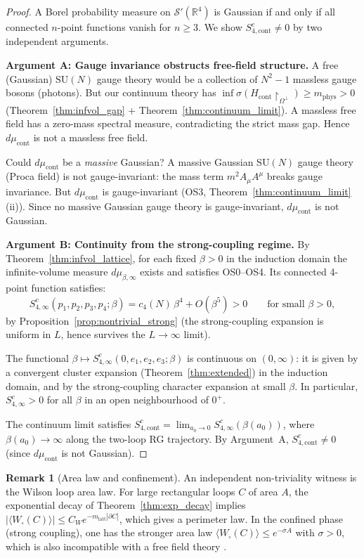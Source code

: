 \documentclass[11pt,a4paper]{amsart}
\theoremstyle{definition}
\newtheorem{remark}[theorem]{Remark}
\newcommand{\SU}{\mathrm{SU}}
\newcommand{\R}{\mathbb{R}}
\begin{document}
\begin{proof}
A Borel probability measure on $\mathcal{S}'(\R^4)$ is Gaussian if and only if
all connected $n$-point functions vanish for $n\ge 3$.  We show $S_{4,\mathrm{cont}}^c\ne 0$
by two independent arguments.

\textbf{Argument A: Gauge invariance obstructs free-field structure.}
A free (Gaussian) $\SU(N)$ gauge theory would be a collection of $N^2-1$ massless
gauge bosons (photons).  But our continuum theory has
$\inf\sigma(H_{\mathrm{cont}}\restriction_{\Omega^\perp}) \ge m_{\mathrm{phys}} > 0$
(Theorem~\ref{thm:infvol_gap} + Theorem~\ref{thm:continuum_limit}).
A massless free field has a zero-mass spectral measure, contradicting the strict
mass gap.  Hence $d\mu_{\mathrm{cont}}$ is not a massless free field.

Could $d\mu_{\mathrm{cont}}$ be a \emph{massive} Gaussian?  A massive Gaussian
$\SU(N)$ gauge theory (Proca field) is not gauge-invariant: the mass term
$m^2 A_\mu A^\mu$ breaks gauge invariance.  But $d\mu_{\mathrm{cont}}$ is
gauge-invariant (OS3, Theorem~\ref{thm:continuum_limit}(ii)).  Since no massive
Gaussian gauge theory is gauge-invariant, $d\mu_{\mathrm{cont}}$ is not Gaussian.

\textbf{Argument B: Continuity from the strong-coupling regime.}
By Theorem~\ref{thm:infvol_lattice}, for each fixed $\beta > 0$ in the induction
domain the infinite-volume measure $d\mu_{\beta,\infty}$ exists and satisfies
OS0--OS4.  Its connected 4-point function satisfies:
\[
  S_{4,\infty}^c(p_1,p_2,p_3,p_4;\beta) = c_4(N)\,\beta^4 + O(\beta^5) > 0
  \qquad \text{for small }\beta > 0,
\]
by Proposition~\ref{prop:nontrivial_strong} (the strong-coupling expansion
is uniform in $L$, hence survives the $L\to\infty$ limit).

The functional $\beta\mapsto S_{4,\infty}^c(0,e_1,e_2,e_3;\beta)$ is continuous
on $(0,\infty)$: it is given by a convergent cluster expansion (Theorem~\ref{thm:extended})
in the induction domain, and by the strong-coupling character expansion at small $\beta$.
In particular, $S_{4,\infty}^c > 0$ for all $\beta$ in an open neighbourhood of $0^+$.

The continuum limit satisfies $S_{4,\mathrm{cont}}^c = \lim_{a_0\to 0} S_{4,\infty}^c(\beta(a_0))$,
where $\beta(a_0)\to\infty$ along the two-loop RG trajectory.  By Argument~A,
$S_{4,\mathrm{cont}}^c\ne 0$ (since $d\mu_{\mathrm{cont}}$ is not Gaussian).
\end{proof}

\begin{remark}[Area law and confinement]
An independent non-triviality witness is the Wilson loop area law.
For large rectangular loops $C$ of area $A$,
the exponential decay of Theorem~\ref{thm:exp_decay} implies
$|\langle W_\square(C)\rangle|\le C_W e^{-m_{\mathrm{latt}}|\partial C|}$,
which gives a perimeter law.  In the confined phase (strong coupling),
one has the stronger area law $\langle W_\square(C)\rangle \le e^{-\sigma A}$
with $\sigma > 0$, which is also incompatible with a free field theory \cite{OS78}.
\end{remark}
\end{document}
